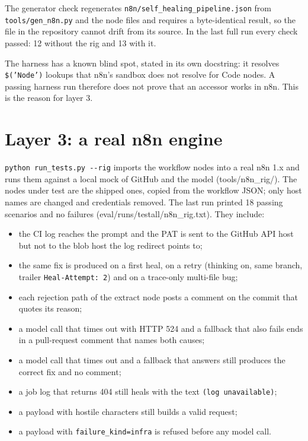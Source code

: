 \documentclass[11pt,a4paper]{report}
\begin{document}
The generator check regenerates \texttt{n8n/\allowbreak{}self\_\allowbreak{}healing\_\allowbreak{}pipeline.\allowbreak{}json} from \texttt{tools/\allowbreak{}gen\_\allowbreak{}n8n.\allowbreak{}py} and the node files and requires a byte-identical result, so the file in the repository cannot drift from its source. In the last full run every check passed: 12 without the rig and 13 with it.

The harness has a known blind spot, stated in its own docstring: it resolves \texttt{\$('Node')} lookups that n8n's sandbox does not resolve for Code nodes. A passing harness run therefore does not prove that an accessor works in n8n. This is the reason for layer 3.

\section{Layer 3: a real n8n engine}

\texttt{python run\_\allowbreak{}tests.\allowbreak{}py -\allowbreak{}-\allowbreak{}rig} imports the workflow nodes into a real n8n 1.x and runs them against a local mock of GitHub and the model (tools/n8n\_rig/). The nodes under test are the shipped ones, copied from the workflow JSON; only host names are changed and credentials removed. The last run printed 18 passing scenarios and no failures (eval/runs/testall/n8n\_rig.txt). They include:

\begin{itemize}[leftmargin=*,itemsep=2pt]
\item the CI log reaches the prompt and the PAT is sent to the GitHub API host but not to the blob host the log redirect points to;
\item the same fix is produced on a first heal, on a retry (thinking on, same branch, trailer \texttt{Heal-\allowbreak{}Attempt: 2}) and on a trace-only multi-file bug;
\item each rejection path of the extract node posts a comment on the commit that quotes its reason;
\item a model call that times out with HTTP 524 and a fallback that also fails ends in a pull-request comment that names both causes;
\item a model call that times out and a fallback that answers still produces the correct fix and no comment;
\item a job log that returns 404 still heals with the text \texttt{(log unavailable)};
\item a payload with hostile characters still builds a valid request;
\item a payload with \texttt{failure\_\allowbreak{}kind=infra} is refused before any model call.
\end{itemize}
\end{document}
